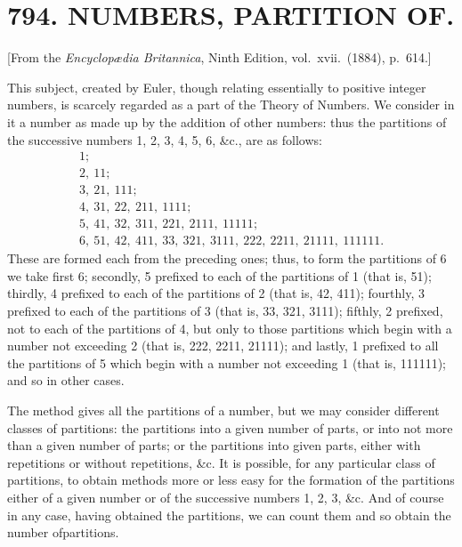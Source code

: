 \documentclass[11pt,a4paper]{book}
\begin{document}
\section*{794. NUMBERS, PARTITION OF.}

\begin{flushright}
\small[From the \textit{Encyclop{\ae}dia Britannica}, Ninth Edition, vol.~xvii.~(1884), p.~614.]
\end{flushright}

This subject, created by Euler, though relating essentially to positive integer numbers, is scarcely regarded as a part of the Theory of Numbers. We consider in it a number as made up by the addition of other numbers: thus the partitions of the successive numbers 1, 2, 3, 4, 5, 6, \&c., are as follows:
\begin{gather*}
1;\\
2,\ 11;\\
3,\ 21,\ 111;\\
4,\ 31,\ 22,\ 211,\ 1111;\\
5,\ 41,\ 32,\ 311,\ 221,\ 2111,\ 11111;\\
6,\ 51,\ 42,\ 411,\ 33,\ 321,\ 3111,\ 222,\ 2211,\ 21111,\ 111111.
\end{gather*}
These are formed each from the preceding ones; thus, to form the partitions of 6 we take first 6; secondly, 5 prefixed to each of the partitions of 1 (that is, 51); thirdly, 4 prefixed to each of the partitions of 2 (that is, 42, 411); fourthly, 3 prefixed to each of the partitions of 3 (that is, 33, 321, 3111); fifthly, 2 prefixed, not to each of the partitions of 4, but only to those partitions which begin with a number not exceeding 2 (that is, 222, 2211, 21111); and lastly, 1 prefixed to all the partitions of 5 which begin with a number not exceeding 1 (that is, 111111); and so in other cases.

The method gives all the partitions of a number, but we may consider different classes of partitions: the partitions into a given number of parts, or into not more than a given number of parts; or the partitions into given parts, either with repetitions or without repetitions, \&c. It is possible, for any particular class of partitions, to obtain methods more or less easy for the formation of the partitions either of a given number or of the successive numbers 1, 2, 3, \&c. And of course in any case, having obtained the partitions, we can count them and so obtain the number ofpartitions.
\end{document}
